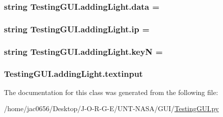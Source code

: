 \subsubsection[{\texorpdfstring{data}{data}}]{\setlength{\rightskip}{0pt plus 5cm}string Testing\+G\+U\+I.\+adding\+Light.\+data = \textquotesingle{}\textquotesingle{}\hspace{0.3cm}{\ttfamily [static]}}\hypertarget{classTestingGUI_1_1addingLight_a763aa941465f77b12ffea9edba79c399}{}\label{classTestingGUI_1_1addingLight_a763aa941465f77b12ffea9edba79c399}
\subsubsection[{\texorpdfstring{ip}{ip}}]{\setlength{\rightskip}{0pt plus 5cm}string Testing\+G\+U\+I.\+adding\+Light.\+ip = \textquotesingle{}\textquotesingle{}\hspace{0.3cm}{\ttfamily [static]}}\hypertarget{classTestingGUI_1_1addingLight_afc65af761152e3325cc2cc225c9e8f7d}{}\label{classTestingGUI_1_1addingLight_afc65af761152e3325cc2cc225c9e8f7d}
\subsubsection[{\texorpdfstring{keyN}{keyN}}]{\setlength{\rightskip}{0pt plus 5cm}string Testing\+G\+U\+I.\+adding\+Light.\+keyN = \textquotesingle{}\textquotesingle{}\hspace{0.3cm}{\ttfamily [static]}}\hypertarget{classTestingGUI_1_1addingLight_ace412281b65c6556693f272d54e46da0}{}\label{classTestingGUI_1_1addingLight_ace412281b65c6556693f272d54e46da0}
\subsubsection[{\texorpdfstring{textinput}{textinput}}]{\setlength{\rightskip}{0pt plus 5cm}Testing\+G\+U\+I.\+adding\+Light.\+textinput}\hypertarget{classTestingGUI_1_1addingLight_a019891e6b3abbd0964de1e86a6a899e1}{}\label{classTestingGUI_1_1addingLight_a019891e6b3abbd0964de1e86a6a899e1}


The documentation for this class was generated from the following file\+:\begin{DoxyCompactItemize}
\item 
/home/jac0656/\+Desktop/\+J-\/\+O-\/\+R-\/\+G-\/\+E/\+U\+N\+T-\/\+N\+A\+S\+A/\+G\+U\+I/\hyperlink{GUI_2TestingGUI_8py}{Testing\+G\+U\+I.\+py}\end{DoxyCompactItemize}
